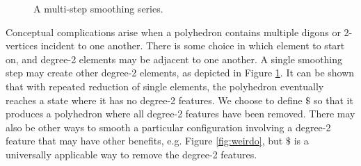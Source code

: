 \documentclass[12pt]{amsart}%
\begin{document}
\begin{figure}[!htbp]

\caption{A multi-step smoothing series.}
\label{fig:multismooth}
\end{figure}

Conceptual complications arise when a polyhedron contains multiple digons or
2-vertices incident to one another. There is some choice in which element to
start on, and degree-2 elements may be adjacent to one another. A single
smoothing step may create other degree-2 elements, as depicted in Figure
\ref{fig:multismooth}. It can be shown that with repeated reduction of single
elements, the polyhedron eventually reaches a state where it has no degree-2
features. We choose to define $\$$ so that it produces a polyhedron where all
degree-2 features have been removed. There may also be other ways to smooth a
particular configuration involving a degree-2 feature that may have other
benefits, e.g. Figure \ref{fig:weirdo},
but $\$$ is a universally applicable way to remove the degree-2 features.
\end{document}
